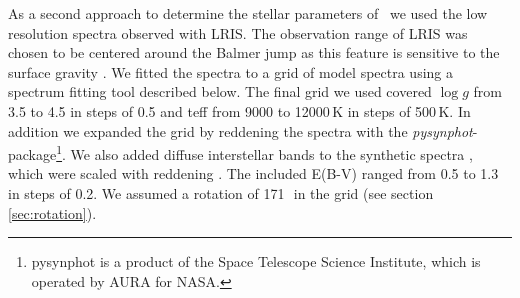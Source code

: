 

As a second approach to determine the stellar parameters of \starb\ we used the low resolution spectra observed with LRIS.  The observation range of LRIS was chosen to be centered around the Balmer jump as this feature is sensitive to the surface gravity \citep{2007PASP..119..605B}. We fitted the spectra to a grid of model spectra \citep[]{2005A&A...442.1127M} using a spectrum fitting tool  described below. The final grid we used covered $\log{g}$ from 3.5 to 4.5 in steps of 0.5 and \gls{teff} from 9000 to 12000\,K in steps of 500\,K. In addition we expanded the grid by reddening the spectra with the \textit{pysynphot}-package\footnote{pysynphot is a product of the Space Telescope Science Institute, which is operated by AURA for NASA.}. We also added diffuse interstellar bands  \citep{1937PASP...49..224B, 1966ZA.....64..512H, 1967IAUS...31...85H, 1975ApJ...196..129H, 1995ARA&A..33...19H, 1994dib..nasa...31H, 1994A&AS..106...39J, 1958ApJ...128...57W} to the synthetic spectra , which were scaled with reddening . The included E(B-V) ranged from 0.5 to 1.3 in steps of 0.2. We assumed a rotation of 171\,\kms\ in the grid  (see section \ref{sec:rotation}).


